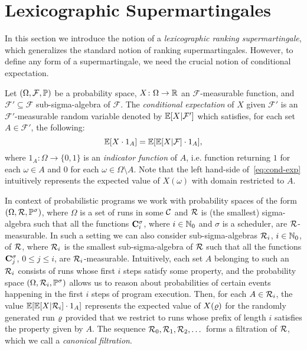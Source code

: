 \section{Lexicographic Supermartingales}
\label{sec:lexicographic}

In this section we introduce the notion of a \emph{lexicographic ranking 
supermartingale}, which generalizes the standard notion of ranking 
supermartingales. However, to define any form of a supermartingale, we need the crucial notion of conditional expectation.

\smallskip{} 
Let $(\Omega,\mathcal{F},\mathbb{P})$ be a probability space, 
$X\colon\Omega\rightarrow 
\mathbb{R}$ an $\mathcal{F}$-measurable function, and $\mathcal{F}'\subseteq 
\mathcal{F}$ sub-sigma-algebra of $\mathcal{F}$. The \emph{conditional 
	expectation} of $X$ given $\mathcal{F}'$ is an $\mathcal{F}'$-measurable random 
variable denoted by $\mathbb{E}[X| \mathcal{F}']$ which satisfies, for each set $A\in 
\mathcal{F}'$, the following: 
\begin{equation}
\label{eq:cond-exp}
\mathbb{E}[X\cdot 1_A] = \mathbb{E}[\mathbb{E}[X|\mathcal{F}]\cdot 1_A],
\end{equation}
where $1_A \colon \Omega\rightarrow \{0,1\}$ is an \emph{indicator function} of 
$A$, i.e. function returning $1$ for 
each $\omega\in A$ and $0$ for each $\omega\in \Omega\setminus A$. Note that 
the left hand-side of~\eqref{eq:cond-exp} intuitively represents the expected 
value 
of $X(\omega)$ with domain restricted to $A$.

In context of probabilistic programs we work with probability 
spaces of the form $(\Omega,\mathcal{R},\mathbb{P}^\sigma)$, where $\Omega$ is a 
set of runs in some $\mathcal{C}$ and $\mathcal{R}$ is (the smallest) sigma-algebra 
such that all the functions $\mathbf{C}^{\sigma}_{i}$, where $i\in \mathbb{N}_0$ and 
$\sigma$ is a scheduler, are $\mathcal{R}$-measurable. In such a setting we can 
also consider sub-sigma-algebras $\mathcal{R}_i$, $i\in \mathbb{N}_0$, of 
$\mathcal{R}$, where $\mathcal{R}_i$ is the smallest sub-sigma-algebra of 
$\mathcal{R}$ such that all the functions $\mathbf{C}^{\sigma}_{j}$, $0\leq j \leq 
i$, are $\mathcal{R}_i$-measurable. Intuitively, each set $A$ belonging to such 
an $\mathcal{R}_i$ consists of runs whose first $i$ steps satisfy some 
property, and the probability space $(\Omega,\mathcal{R}_i,\mathbb{P}^\sigma)$ 
allows us to reason about probabilities of certain events happening in the 
first 
$i$ steps of program execution. 
Then, for each $A\in \mathcal{R}_i$, the 
value $\mathbb{E}[\mathbb{E}[X|\mathcal{R}_i]\cdot 1_A]$ represents the expected value of 
$X(\varrho)$ for the randomly generated run $\varrho$ provided that we restrict to 
runs whose
prefix of length $i$ satisfies the property given by $A$. 
The sequence $\mathcal{R}_0,\mathcal{R}_1,\mathcal{R}_2,\dots$ forms a 
filtration of $\mathcal{R}$, which we call a \emph{canonical filtration}.

